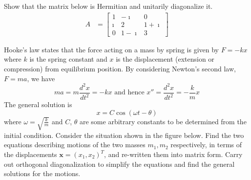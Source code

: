 \begin{Exercise}
Show that the matrix below is Hermitian and unitarily diagonalize it.
\begin{align*}
A &=
\begin{bmatrix}
1 & -\imath & 0 \\
\imath & 2 & 1+\imath \\
0 & 1-\imath & 3 
\end{bmatrix}
\end{align*}
\end{Exercise}

\begin{Exercise}
Hooke's law states that the force acting on a mass by spring is given by $F = -kx$ where $k$ is the spring constant and $x$ is the displacement (extension or compression) from equilibrium position. By considering Newton's second law, $F = ma$, we have
\begin{equation*}
ma = m\frac{d^2x}{dt^2} = -kx\text{ and hence }x'' = \frac{d^2x}{dt^2} = -\frac{k}{m}x
\end{equation*}
The general solution is
\begin{equation*}
x = C\cos(\omega t - \theta)
\end{equation*}
where $\omega = \sqrt{\frac{k}{m}}$ and $C$, $\theta$ are some arbitrary constants to be determined from the initial condition. Consider the situation  shown in the figure below. Find the two equations describing motions of the two masses $m_1, m_2$ respectively, in terms of the displacements $\textbf{x} = (x_1, x_2)^T$, and re-written them into matrix form. Carry out orthogonal diagonalization to simplify the equations and find the general solutions for the motions.
\begin{center}
\end{center}
\end{Exercise}
